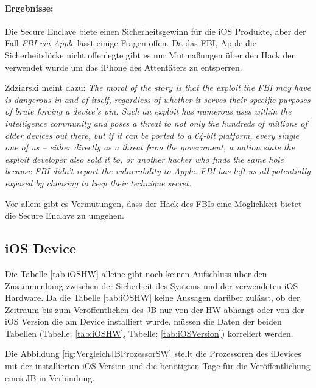 \paragraph{Ergebnisse:} Die Secure Enclave biete einen Sicherheitsgewinn für die iOS Produkte, aber der Fall \textit{\glqq FBI via Apple\grqq{}} lässt einige Fragen offen. Da das FBI, Apple die Sicherheitslücke nicht offenlegte gibt es nur Mutmaßungen über den Hack der verwendet wurde um das iPhone des Attentäters zu entsperren. \par 
Zdziarski meint dazu: \textit{\glqq The moral of the story is that the exploit the FBI may have is dangerous in and of itself, regardless of whether it serves their specific purposes of brute forcing a device’s pin. Such an exploit has numerous uses within the intelligence community and poses a threat to not only the hundreds of millions of older devices out there, but if it can be ported to a 64-bit platform, every single one of us – either directly as a threat from the government, a nation state the exploit developer also sold it to, or another hacker who finds the same hole because FBI didn’t report the vulnerability to Apple. FBI has left us all potentially exposed by choosing to keep their technique secret.\grqq{}} \cite{Hacking[4]} \par 
Vor allem gibt es Vermutungen, dass der Hack des FBIs eine Möglichkeit bietet die Secure Enclave zu umgehen.

\subsection{iOS Device}
\label{sec:Frage1iOSDevice} 

Die Tabelle \ref{tab:iOSHW} alleine gibt noch keinen Aufschluss über den Zusammenhang zwischen der Sicherheit des Systems und der verwendeten iOS Hardware. Da die Tabelle \ref{tab:iOSHW} keine Aussagen darüber zulässt, ob der Zeitraum bis zum Veröffentlichen des JB nur von der HW abhängt oder von der iOS Version die am Device installiert wurde, müssen die Daten der beiden Tabellen (Tabelle: \ref{tab:iOSHW}, Tabelle: \ref{tab:iOSVersion}) korreliert werden. \par 
Die Abbildung \ref{fig:VergleichJBProzessorSW} stellt die Prozessoren des iDevices mit der installierten iOS Version und die benötigten Tage für die Veröffentlichung eines JB in Verbindung. \par


